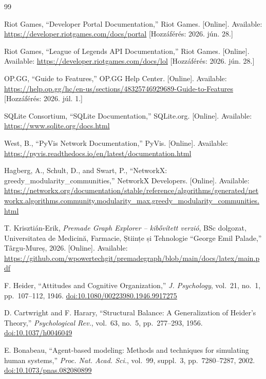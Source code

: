 \begin{thebibliography}{99}

Riot Games, ``Developer Portal Documentation,'' Riot Games. [Online]. Available:
\url{https://developer.riotgames.com/docs/portal}
[Hozzáférés: 2026. jún. 28.]

Riot Games, ``League of Legends API Documentation,'' Riot Games. [Online]. Available:
\url{https://developer.riotgames.com/docs/lol}
[Hozzáférés: 2026. jún. 28.]

OP.GG, ``Guide to Features,'' OP.GG Help Center. [Online]. Available:
\url{https://help.op.gg/hc/en-us/sections/48325746929689-Guide-to-Features}
[Hozzáférés: 2026. júl. 1.]

SQLite Consortium, ``SQLite Documentation,'' SQLite.org. [Online]. Available:
\url{https://www.sqlite.org/docs.html}

West, B., ``PyVis Network Documentation,'' PyVis. [Online]. Available:
\url{https://pyvis.readthedocs.io/en/latest/documentation.html}

Hagberg, A., Schult, D., and Swart, P., ``NetworkX: greedy\_modularity\_communities,''
NetworkX Developers. [Online]. Available:
\url{https://networkx.org/documentation/stable/reference/algorithms/generated/networkx.algorithms.community.modularity_max.greedy_modularity_communities.html}

T. Krisztián-Erik, \textit{Premade Graph Explorer -- kibővített verzió}, BSc dolgozat,
Universitatea de Medicină, Farmacie, Științe și Tehnologie ``George Emil Palade,''
Târgu-Mureș, 2026. [Online]. Available:
\url{https://github.com/wpowertechgit/premadegraph/blob/main/docs/latex/main.pdf}

F. Heider, ``Attitudes and Cognitive Organization,''
\textit{J. Psychology}, vol.~21, no.~1, pp.~107--112, 1946.
\href{https://doi.org/10.1080/00223980.1946.9917275}{doi:10.1080/00223980.1946.9917275}

D. Cartwright and F. Harary, ``Structural Balance: A Generalization of Heider's Theory,''
\textit{Psychological Rev.}, vol.~63, no.~5, pp.~277--293, 1956.
\href{https://doi.org/10.1037/h0046049}{doi:10.1037/h0046049}

E. Bonabeau, ``Agent-based modeling: Methods and techniques for simulating human systems,''
\textit{Proc. Nat. Acad. Sci.}, vol.~99, suppl.~3, pp.~7280--7287, 2002.
\href{https://doi.org/10.1073/pnas.082080899}{doi:10.1073/pnas.082080899}


\end{thebibliography}
